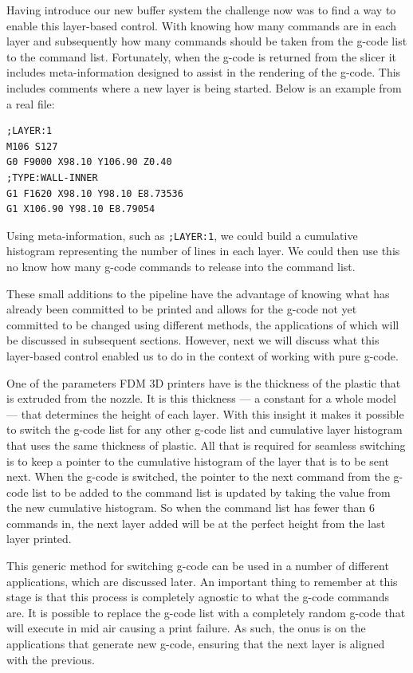 \documentclass[pdftex, 11pt]{report} %
\begin{document}
Having introduce our new buffer system the challenge now was to find a way to enable this layer-based control. With knowing how many commands are in each layer and subsequently how many commands should be taken from the g-code list to the command list. Fortunately, when the g-code is returned from the slicer it includes meta-information designed to assist in the rendering of the g-code. This includes comments where a new layer is being started. Below is an example from a real file:
\begin{verbatim}
;LAYER:1
M106 S127
G0 F9000 X98.10 Y106.90 Z0.40
;TYPE:WALL-INNER
G1 F1620 X98.10 Y98.10 E8.73536
G1 X106.90 Y98.10 E8.79054
\end{verbatim}

Using meta-information, such as \verb|;LAYER:1|,  we could build a cumulative histogram representing the number of lines in each layer. We could then use this no know how many g-code commands to release into the command list. 

These small additions to the pipeline have the advantage of knowing what has already been committed to be printed and allows for the g-code not yet committed to be changed using different methods, the applications of which will be discussed in subsequent sections. However, next we will discuss what this layer-based control enabled us to do in the context of working with pure g-code. 

One of the parameters FDM 3D printers have is the thickness of the plastic that is extruded from the nozzle. It is this thickness --- a constant for a whole model --- that determines the height of each layer. With this insight it makes it possible to switch the g-code list for any other g-code list and cumulative layer histogram that uses the same thickness of plastic. All that is required for seamless switching is to keep a pointer to the cumulative histogram of the layer that is to be sent next. When the g-code is switched, the pointer to the next command from the g-code list to be added to the command list is updated by taking the value from the new cumulative histogram. So when the command list has fewer than 6 commands in, the next layer added will be at the perfect height from the last layer printed. 

This generic method for switching g-code can be used in a number of different applications, which are discussed later. An important thing to remember at this stage is that this process is completely agnostic to what the g-code commands are. It is possible to replace the g-code list with a completely random g-code that will execute in mid air causing a print failure. As such, the onus is on the applications that generate new g-code, ensuring that the next layer is aligned with the previous.
\end{document}
